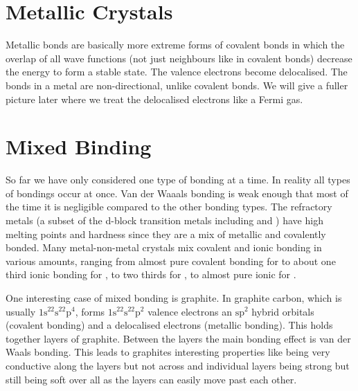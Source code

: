 \documentclass[fleqn]{NotesClass}
\begin{document}
    \section{Metallic Crystals}
    Metallic bonds are basically more extreme forms of covalent bonds in which the overlap of all wave functions (not just neighbours like in covalent bonds) decrease the energy to form a stable state.
    The valence electrons become delocalised.
    The bonds in a metal are non-directional, unlike covalent bonds.
    We will give a fuller picture later where we treat the delocalised electrons like a Fermi gas.
    
    \section{Mixed Binding}
    So far we have only considered one type of bonding at a time.
    In reality all types of bondings occur at once.
    Van der Waaals bonding is weak enough that most of the time it is negligible compared to the other bonding types.
    The refractory metals (a subset of the d-block transition metals including  and ) have high melting points and hardness since they are a mix of metallic and covalently bonded.
    Many metal-non-metal crystals mix covalent and ionic bonding in various amounts, ranging from almost pure covalent bonding for  to about one third ionic bonding for , to two thirds for , to almost pure ionic for .
    
    One interesting case of mixed bonding is graphite.
    In graphite carbon, which is usually \(\mathrm{1s^22s^22p^4}\), forms \(\mathrm{1s^22s^22p^2}\) valence electrons an \(\mathrm{sp^2}\) hybrid orbitals (covalent bonding) and a delocalised electrons (metallic bonding).
    This holds together layers of graphite.
    Between the layers the main bonding effect is van der Waals bonding.
    This leads to graphites interesting properties like being very conductive along the layers but not across and individual layers being strong but still being soft over all as the layers can easily move past each other.
    
%        

    \backmatter
    \renewcommand{\glossaryname}{Acronyms}
    \printglossary[acronym]
    \printindex
\end{document}
